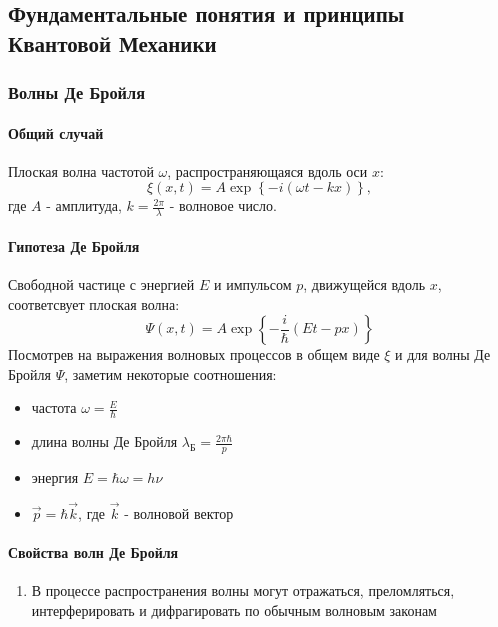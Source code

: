\subsection{Фундаментальные понятия и принципы Квантовой Механики}

\subsubsection{Волны Де Бройля}
\label{sec:waves}
\begin{multicols}{2}
	
\paragraph{Общий случай} Плоская волна частотой $\omega$, распространяющаяся вдоль оси $x$:
\begin{equation*}
	\xi(x,t) = A \exp \left\{-i(\omega t -kx)\right\},
\end{equation*}
где $A$ - амплитуда, $k=\frac{2\pi}{\lambda}$ - волновое число.

\paragraph{Гипотеза Де Бройля} 
\thispagestyle{empty}
Свободной частице с энергией $E$ и импульсом $p$, движущейся вдоль $x$, соответсвует плоская волна:
\begin{equation*}
	\Psi(x, t) = A \exp \left\{-\frac{i}{\hbar}(E t - px)\right\}
\end{equation*}
Посмотрев на выражения волновых процессов в общем виде $\xi$ и для волны Де Бройля $\Psi$, заметим некоторые соотношения:
\begin{itemize}
	\item частота $\omega = \frac{E}{\hbar}$
	\item длина волны Де Бройля $\lambda_{\text{Б}}=\frac{2\pi\hbar}{p}$
	\item энергия $E = \hbar \omega = h\nu$
	\item $\vec p = \hbar \vec k$, где $\vec k$ - волновой вектор
\end{itemize}

\paragraph{Свойства волн Де Бройля}
\begin{enumerate}[label=\textbf{№~\arabic{enumi}}]
	\item В процессе распространения волны могут отражаться, преломляться, интерферировать и дифрагировать по обычным волновым законам
	

\end{enumerate}
\end{multicols}
